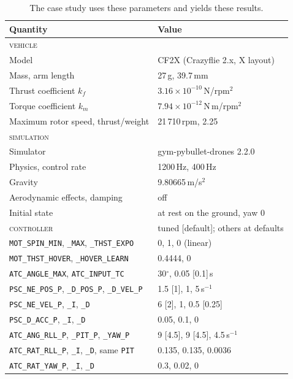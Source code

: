 \begin{table}[t]
\newcommand{\RD}[1]{\makebox[2.15cm][l]{#1}}%
\small
\caption{\textnormal{The case study uses these parameters and yields these results.}}
\label{tab:params}
\setlength{\tabcolsep}{4pt}
\begin{tabular*}{\linewidth}{@{}l@{\extracolsep{\fill}}l@{}}
\toprule
Quantity & Value \\
\midrule
\textsc{vehicle} & \\
Model & CF2X (Crazyflie 2.x, X layout) \\
Mass, arm length & 27\,g, 39.7\,mm \\
Thrust coefficient $k_f$ & $3.16\times10^{-10}$\,N/rpm$^2$ \\
Torque coefficient $k_m$ & $7.94\times10^{-12}$\,N\,m/rpm$^2$ \\
Maximum rotor speed, thrust/weight & 21\,710\,rpm, 2.25 \\
\midrule
\textsc{simulation} & \\
Simulator & gym-pybullet-drones 2.2.0 \\
Physics, control rate & 1200\,Hz, 400\,Hz \\
Gravity & 9.80665\,m/s$^2$ \\
Aerodynamic effects, damping & off \\
Initial state & at rest on the ground, yaw 0 \\
\midrule
\textsc{controller} & tuned [default]; others at defaults \\
\texttt{MOT\_SPIN\_MIN}, \texttt{\_MAX}, \texttt{\_THST\_EXPO} & 0, 1, 0 (linear) \\
\texttt{MOT\_THST\_HOVER}, \texttt{\_HOVER\_LEARN} & 0.4444, 0 \\
\texttt{ATC\_ANGLE\_MAX}, \texttt{ATC\_INPUT\_TC} & 30$^\circ$, 0.05 [0.1]\,s \\
\texttt{PSC\_NE\_POS\_P}, \texttt{\_D\_POS\_P}, \texttt{\_D\_VEL\_P} & 1.5 [1], 1, 5\,s$^{-1}$ \\
\texttt{PSC\_NE\_VEL\_P}, \texttt{\_I}, \texttt{\_D} & 6 [2], 1, 0.5 [0.25] \\
\texttt{PSC\_D\_ACC\_P}, \texttt{\_I}, \texttt{\_D} & 0.05, 0.1, 0 \\
\texttt{ATC\_ANG\_RLL\_P}, \texttt{\_PIT\_P}, \texttt{\_YAW\_P} & 9 [4.5], 9 [4.5], 4.5\,s$^{-1}$ \\
\texttt{ATC\_RAT\_RLL\_P}, \texttt{\_I}, \texttt{\_D}, same \texttt{PIT} & 0.135, 0.135, 0.0036 \\
\texttt{ATC\_RAT\_YAW\_P}, \texttt{\_I}, \texttt{\_D} & 0.3, 0.02, 0 \\

\end{tabular*}
\end{table}
